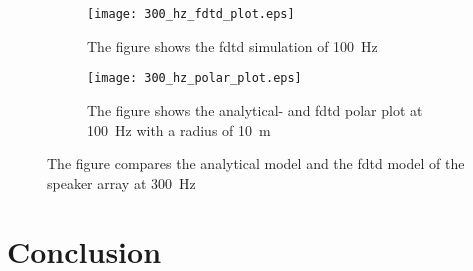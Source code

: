\begin{figure}[H]
\centering
\begin{subfigure}[htbp]{0.55\textwidth}
		\texttt{[image: 300\_hz\_fdtd\_plot.eps]}
		\caption{The figure shows the \gls{fdtd} simulation of \SI{100}{\hertz}}
		\label{fig:fdtd_300_Hz}
\end{subfigure}
\begin{subfigure}[htbp]{0.35\textwidth}
		\texttt{[image: 300\_hz\_polar\_plot.eps]}
		\caption{The figure shows the analytical- and \gls{fdtd} polar plot at \SI{100}{\hertz} with a radius of \SI{10}{\meter}}
		\label{fig:polar_300_Hz}
\end{subfigure} 
\caption{The figure compares the analytical model and the \gls{fdtd} model of the speaker array at \SI{300}{\hertz}}
\end{figure}

\section{Conclusion}